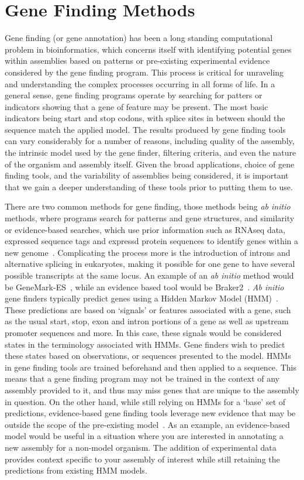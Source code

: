 \section{Gene Finding Methods}
Gene finding (or gene annotation) has been a long standing
computational problem in bioinformatics, which concerns itself with
identifying potential genes within assemblies based on patterns or
pre-existing experimental evidence considered by the gene finding
program. This process is critical for unraveling and understanding the
complex processes occurring in all forms of life. In a general sense,
gene finding programs operate by searching for patters or indicators
showing that a gene of feature may be present. The most basic
indicators being start and stop codons, with splice sites in
between should the sequence match the applied model. The results
produced by gene finding tools can vary considerably for a number of
reasons, including quality of the assembly, the intrinsic model used
by the gene finder, filtering criteria, and even the nature of the
organism and assembly itself. Given the broad applications, choice of
gene finding tools, and the variability of assemblies being
considered, it is important that we gain a deeper understanding of
these tools prior to putting them to use.

There are two common methods for gene finding, those methods being
\textit{ab initio} methods, where programs search for patterns and
gene structures, and similarity or evidence-based searches, which use
prior information such as RNAseq data, expressed sequence tags and
expressd protein sequences to identify genes within a new
genome~\cite{ejigu2020a}. Complicating the process more is the
introduction of introns and alternative splicing in eukaryotes, making
it possible for one gene to have several possible transcripts at the
same locus. An example of an \textit{ab initio} method would be
GeneMark-ES~\cite{borodovsky2011a}, while an evidence based tool
would be Braker2~\cite{bruna2021a}.
\textit{Ab initio} gene finders typically predict genes using a Hidden
Markov Model (HMM)~\cite{ejigu2020a}. These predictions are based on
`signals' or features associated with a gene, such as the usual start,
stop, exon and intron portions of a gene as well as upstream promoter
sequences and more. In this case, these signals would be considered
states in the terminology associated with HMMs. Gene finders wish to
predict these states based on observations, or sequences presented to
the model. HMMs in gene finding tools are trained beforehand and then
applied to a sequence. This means that a gene finding program may not
be trained in the context of any assembly provided to it, and thus may
miss genes that are unique to the assembly in question.
On the other hand, while still relying on HMMs for a `base' set of
predictions, evidence-based gene finding tools leverage new evidence
that may be outside the scope of the pre-existing
model~\cite{Keller2011}.  As an example, an evidence-based model would
be useful in a situation where you are interested in annotating a new
assembly for a non-model organism. The addition of experimental data
provides context specific to your assembly of interest while still
retaining the predictions from existing HMM models.

